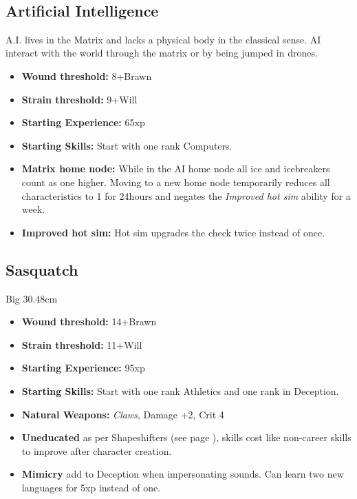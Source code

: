 \documentclass{book}
\begin{document}
\mbox{ }
\begin{multicols}{2}
	\subsection{Artificial Intelligence}
	A.I. lives in the Matrix and lacks a physical body in the classical sense. AI interact with the world through the matrix or by being jumped in drones.
	
	\begin{itemize}
		\item \textbf{Wound threshold:} 8+Brawn
		\item \textbf{Strain threshold:} 9+Will
		\item \textbf{Starting Experience:} 65xp
		\item \textbf{Starting Skills:} Start with one rank Computers.
		\item \textbf{Matrix home node:} While in the AI home node all ice and icebreakers count as one higher. Moving to a new home node temporarily reduces all characteristics to 1 for 24hours and negates the \textit{Improved hot sim} ability for a week.
		\item \textbf{Improved hot sim: } Hot sim upgrades the check twice instead of once. 
	\end{itemize}
	
	
	\subsection{Sasquatch}	
	Big 30.48cm
	
	\begin{itemize}
		\item \textbf{Wound threshold:} 14+Brawn
		\item \textbf{Strain threshold:} 11+Will
		\item \textbf{Starting Experience:} 95xp
		\item \textbf{Starting Skills:} Start with one rank Athletics and one rank in Deception.
		\item \textbf{Natural Weapons:} \textit{Claws}, Damage +2, Crit 4
		\item \textbf{Uneducated} as per Shapeshifters (see page \pageref{uneducated}), skills cost like non-career skills to improve after character creation.
		\item \textbf{Mimicry} add \BoostDie to Deception when impersonating sounds. Can learn two new languages for 5xp instead of one.
	\end{itemize}
\end{multicols}
\end{document}
